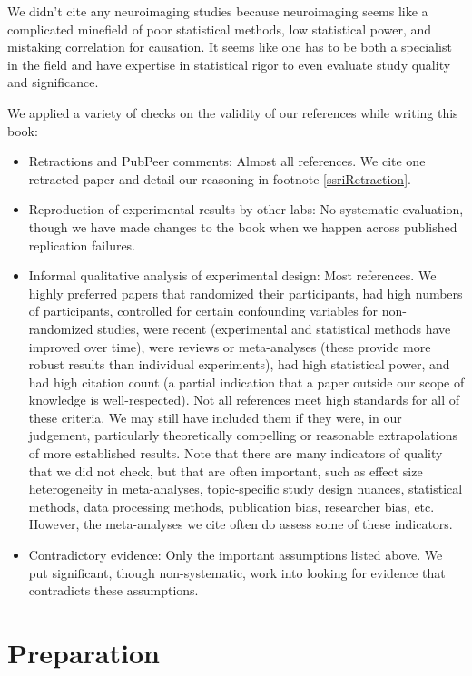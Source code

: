 \documentclass[12pt,letterpaper]{book}
\begin{document}
We didn't cite any neuroimaging studies because neuroimaging seems like a complicated minefield of poor statistical methods, low statistical power, and mistaking correlation for causation. It seems like one has to be both a specialist in the field and have expertise in statistical rigor to even evaluate study quality and significance.

We applied a variety of checks on the validity of our references while writing this book:
\begin{itemize}
    \item Retractions and PubPeer comments: Almost all references. We cite one retracted paper and detail our reasoning in footnote \ref{ssriRetraction}.
    \item Reproduction of experimental results by other labs: No systematic evaluation, though we have made changes to the book when we happen across published replication failures.
    \item Informal qualitative analysis of experimental design: Most references. We highly preferred papers that randomized their participants, had high numbers of participants, controlled for certain confounding variables for non-randomized studies, were recent (experimental and statistical methods have improved over time), were reviews or meta-analyses (these provide more robust results than individual experiments), had high statistical power, and had high citation count (a partial indication that a paper outside our scope of knowledge is well-respected). Not all references meet high standards for all of these criteria. We may still have included them if they were, in our judgement, particularly theoretically compelling or reasonable extrapolations of more established results. Note that there are many indicators of quality that we did not check, but that are often important, such as effect size heterogeneity in meta-analyses, topic-specific study design nuances, statistical methods, data processing methods, publication bias, researcher bias, etc. However, the meta-analyses we cite often do assess some of these indicators.
    \item Contradictory evidence: Only the important assumptions listed above. We put significant, though non-systematic, work into looking for evidence that contradicts these assumptions.
\end{itemize}
\chapter{Preparation}
\end{document}
